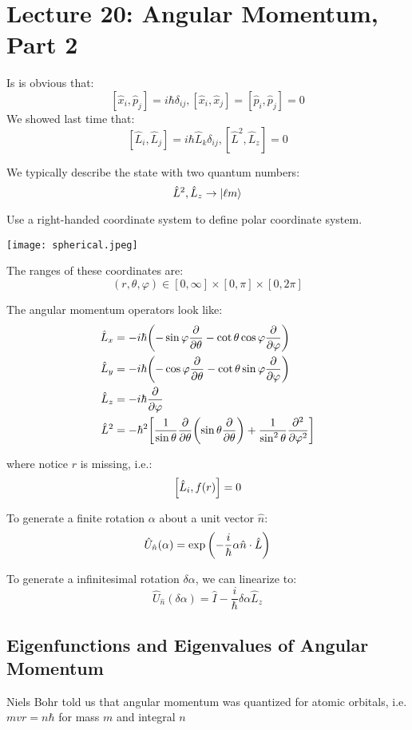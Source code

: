 \section{Lecture 20: Angular Momentum, Part 2}

Is is obvious that:
\[ [\hat{x}_i, \hat{p}_j] = i \hbar \delta_{ij}, [\hat{x}_i, \hat{x}_j] = [\hat{p}_i, \hat{p}_j] = 0 \]
We showed last time that:
\[ [\hat{L}_i, \hat{L}_j] = i \hbar \hat{L}_k \delta_{ij}, [\hat{L}^2, \hat{L}_z] = 0 \]

We typically describe the state with two quantum numbers:
\[ \hat{L}^2, \hat{L}_z \to \ket{\ell m}  \]

Use a right-handed coordinate system to define polar coordinate system.

\texttt{[image: spherical.jpeg]}

The ranges of these coordinates are:
\[ (r, \theta, \varphi) \in [0, \infty] \times [0, \pi] \times [0, 2\pi]\]

The angular momentum operators look like:
\begin{align*}
    \hat{L}_x &= -i\hbar\qty(- \sin \varphi \pdv{}{\theta} - \cot \theta \cos \varphi \pdv{}{\varphi}) \\
    \hat{L}_y &= -i\hbar\qty(- \cos \varphi \pdv{}{\theta} - \cot \theta \sin \varphi \pdv{}{\varphi}) \\
    \hat{L}_z &= -i\hbar \pdv{}{\varphi} \\
    \hat{L}^2 &= -\hbar^2\qty[\frac{1}{\sin \theta} \pdv{}{\theta} \qty(\sin \theta \pdv{}{\theta}) + \frac{1}{\sin^2\theta} \pdv{^2}{\varphi^2}]
\end{align*}

where notice $r$ is missing, i.e.:
\[ \comm{\hat{L}_i}{f(r)} = 0 \]

\begin{theorem}
    To generate a finite rotation $\alpha$ about a unit vector $\hat{n}$:
    \[ \hat{U}_{\hat{n}}(\alpha) = \exp\qty(- \frac{i}{\hbar} \alpha \hat{n} \cdot \hat{L})\]

    To generate a infinitesimal rotation $\delta \alpha$, we can linearize to:
    \[ \hat{U}_{\hat{n}}(\delta\alpha) = \hat{I} - \frac{i}{\hbar} \delta\alpha \hat{L}_z\]
\end{theorem}

\subsection{Eigenfunctions and Eigenvalues of Angular Momentum}
Niels Bohr told us that angular momentum was quantized for atomic orbitals, i.e. $mvr = n \hbar$ for mass $m$ and integral $n$


